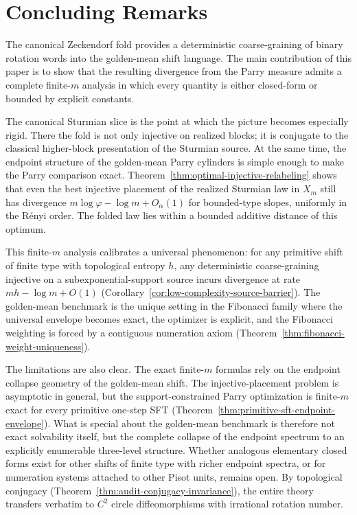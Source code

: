 \section{Concluding Remarks}
\label{sec:concluding}

The canonical Zeckendorf fold provides a deterministic coarse-graining of
binary rotation words into the golden-mean shift language. The main
contribution of this paper is to show that the resulting divergence from the
Parry measure admits a complete finite-\(m\) analysis in which every quantity
is either closed-form or bounded by explicit constants.

The canonical Sturmian slice is the point at which the picture becomes
especially rigid. There the fold is not only injective on realized blocks; it
is conjugate to the classical higher-block presentation of the Sturmian source.
At the same time, the endpoint structure of the golden-mean Parry cylinders is
simple enough to make the Parry comparison exact.
Theorem~\ref{thm:optimal-injective-relabeling} shows that even the best
injective placement of the realized Sturmian law in \(X_m\) still has
divergence \(m\log\varphi-\log m+O_\alpha(1)\) for bounded-type slopes,
uniformly in the R\'enyi order. The folded law lies within a bounded additive
distance of this optimum.

This finite-\(m\) analysis calibrates a universal phenomenon: for any
primitive shift of finite type with topological entropy \(h\), any
deterministic coarse-graining injective on a subexponential-support source
incurs divergence at rate \(mh-\log m+O(1)\)
(Corollary~\ref{cor:low-complexity-source-barrier}). The golden-mean benchmark
is the unique setting in the Fibonacci family where the universal envelope
becomes exact, the optimizer is explicit, and the Fibonacci weighting is forced
by a contiguous numeration axiom
(Theorem~\ref{thm:fibonacci-weight-uniqueness}).

The limitations are also clear. The exact finite-\(m\) formulas rely on the
endpoint collapse geometry of the golden-mean shift. The injective-placement
problem is asymptotic in general, but the support-constrained Parry
optimization is finite-\(m\) exact for every primitive one-step SFT
(Theorem~\ref{thm:primitive-sft-endpoint-envelope}). What is special about the
golden-mean benchmark is therefore not exact solvability itself, but the
complete collapse of the endpoint spectrum to an explicitly enumerable
three-level structure. Whether analogous elementary closed forms exist for
other shifts of finite type with richer endpoint spectra, or for numeration
systems attached to other Pisot units, remains open. By topological conjugacy
(Theorem~\ref{thm:audit-conjugacy-invariance}), the entire theory transfers
verbatim to \(C^2\) circle diffeomorphisms with irrational rotation number.
